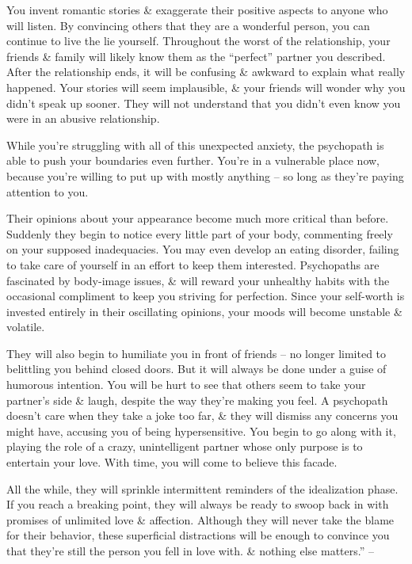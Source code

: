 \documentclass{article}
\numberwithin{equation}{section}
\begin{document}
You invent romantic stories \& exaggerate their positive aspects to anyone who will listen. By convincing others that they are a wonderful person, you can continue to live the lie yourself. Throughout the worst of the relationship, your friends \& family will likely know them as the ``perfect'' partner you described. After the relationship ends, it will be confusing \& awkward to explain what really happened. Your stories will seem implausible, \& your friends will wonder why you didn't speak up sooner. They will not understand that you didn't even know you were in an abusive relationship.

While you're struggling with all of this unexpected anxiety, the psychopath is able to push your boundaries even further. You're in a vulnerable place now, because you're willing to put up with mostly anything -- so long as they're paying attention to you.

Their opinions about your appearance become much more critical than before. Suddenly they begin to notice every little part of your body, commenting freely on your supposed inadequacies. You may even develop an eating disorder, failing to take care of yourself in an effort to keep them interested. Psychopaths are fascinated by body-image issues, \& will reward your unhealthy habits with the occasional compliment to keep you striving for perfection. Since your self-worth is invested entirely in their oscillating opinions, your moods will become unstable \& volatile.

They will also begin to humiliate you in front of friends -- no longer limited to belittling you behind closed doors. But it will always be done under a guise of humorous intention. You will be hurt to see that others seem to take your partner's side \& laugh, despite the way they're making you feel. A psychopath doesn't care when they take a joke too far, \& they will dismiss any concerns you might have, accusing you of being hypersensitive. You begin to go along with it, playing the role of a crazy, unintelligent partner whose only purpose is to entertain your love. With time, you will come to believe this facade.

All the while, they will sprinkle intermittent reminders of the idealization phase. If you reach a breaking point, they will always be ready to swoop back in with promises of unlimited love \& affection. Although they will never take the blame for their behavior, these superficial distractions will be enough to convince you that they're still the person you fell in love with. \& nothing else matters.'' -- \cite[pp. 37--39]{MacKenzie2015}
\end{document}
